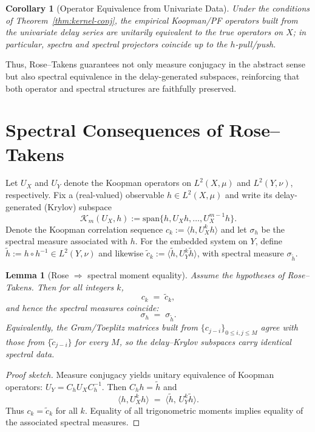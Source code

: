 \documentclass[11pt]{article}
\newtheorem{corollary}{Corollary}
\newtheorem{lemma}{Lemma}
\begin{document}
\begin{corollary}[Operator Equivalence from Univariate Data]
Under the conditions of Theorem~\ref{thm:kernel-conj}, the empirical Koopman/PF operators built from the univariate delay series are unitarily equivalent to the true operators on $X$; in particular, spectra and spectral projectors coincide up to the $h$-pull/push.
\end{corollary}

Thus, Rose--Takens guarantees not only measure conjugacy in the abstract sense but also spectral equivalence in the delay-generated subspaces, reinforcing that both operator and spectral structures are faithfully preserved.

\section{Spectral Consequences of Rose--Takens}\label{sec:spectral}

Let $U_X$ and $U_Y$ denote the Koopman operators on $L^2(X,\mu)$ and $L^2(Y,\nu)$, respectively. 
Fix a (real-valued) observable $h\in L^2(X,\mu)$ and write its delay-generated (Krylov) subspace
\[
  \mathcal K_m(U_X,h) := \mathrm{span}\{h, U_X h, \dots, U_X^{m-1}h\}.
\]
Denote the Koopman correlation sequence $c_k := \langle h, U_X^k h\rangle$ and let $\sigma_h$ be the spectral measure associated with $h$. For the embedded system on $Y$, define $\tilde h := h\circ h^{-1}\in L^2(Y,\nu)$ and likewise $\tilde c_k := \langle \tilde h, U_Y^k \tilde h\rangle$, with spectral measure $\sigma_{\tilde h}$.

\begin{lemma}[Rose $\Rightarrow$ spectral moment equality]
Assume the hypotheses of Rose--Takens. Then for all integers $k$,
\[
  c_k \;=\; \tilde c_k,
\]
and hence the spectral measures coincide:
\[
  \sigma_h \;=\; \sigma_{\tilde h}.
\]
Equivalently, the Gram/Toeplitz matrices built from $\{c_{j-i}\}_{0\le i,j\le M}$ agree with those from $\{\tilde c_{j-i}\}$ for every $M$, so the delay–Krylov subspaces carry identical spectral data.
\end{lemma}

\begin{proof}[Proof sketch]
Measure conjugacy yields unitary equivalence of Koopman operators: $U_Y = C_h U_X C_h^{-1}$. Then $C_h h = \tilde h$ and
\[
  \langle h, U_X^k h\rangle \;=\; \langle \tilde h,\, U_Y^k \tilde h\rangle.
\]
Thus $c_k=\tilde c_k$ for all $k$. Equality of all trigonometric moments implies equality of the associated spectral measures.
\end{proof}
\end{document}
